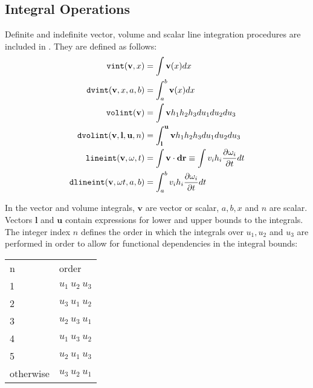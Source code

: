 \subsection{Integral Operations}
Definite and indefinite vector, volume and scalar line integration
procedures are included in .  They are defined as follows:
 
 
 
\hypertarget{operator:VINT}{}
\hypertarget{operator:DVINT}{}
\hypertarget{operator:VOLINT}{}
\hypertarget{operator:DVOLINT}{}
\hypertarget{operator:LINEINT_OV}{}
\hypertarget{operator:DLINEINT}{}
\begin{align*}
\f{vint} (\mathbf{v},x) & =  \int \mathbf{v}(x)dx\\
%
\f{dvint} (\mathbf{v},x, a, b) & =  \int^{b}_{a} \mathbf{v} (x) dx\\
%
\f{volint} (\mathbf{v}) & =  \int \mathbf{v} h_{1} h_{2} h_{3} du_{1} du_{2} du_{3}\\
%
\f{dvolint}(\mathbf{v},\mathbf{l},\mathbf{u},n) & = \int^{\mathbf{u}}_{\mathbf{l}}
\mathbf{v} h_{1} h_{2} h_{3} du_{1} du_{2} du_{3}\\
%
\f{lineint} (\mathbf{v, \omega}, t) & =  \int \mathbf{v} \cdot \mathbf{dr}
\equiv \int v_{i} h_{i} \frac{\partial \omega_{i}}{\partial t} dt\\
%
\f{dlineint} (\mathbf{v, \omega} t, a, b) & = \int^{b}_{a} v_i h_i
\frac{\partial \omega_{i}}{\partial t} dt
\end{align*}

In the vector and volume integrals, $\mathbf{v}$ are vector or scalar,
$a, b,x$ and $n$ are scalar.  Vectors $\mathbf{l}$ and $\mathbf{u}$ contain
expressions for lower and upper bounds to the integrals.  The integer
index $n$ defines the order in which the integrals over $u_1, u_2$ and
$u_3$ are performed in order to allow for functional dependencies in
the integral bounds:

\begin{center} 
\begin{tabular}{ll}
n & order\\ 1 & $u_1~u_2~u_3$\\
%
2 & $u_3~u_1~u_2$\\
%
3 & $u_2~u_3~u_1$\\
%
4 & $u_1~u_3~u_2$\\
%
5 & $u_2~u_1~u_3$\\ otherwise & $u_3~u_2~u_1$\\
\end{tabular}
\end{center}


